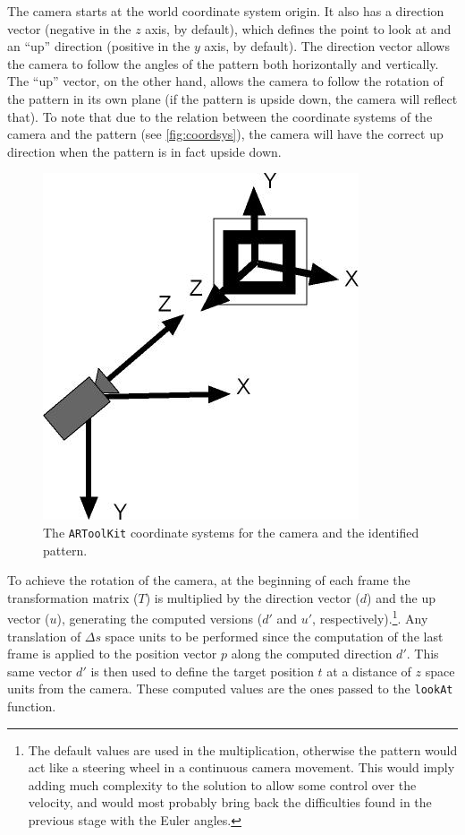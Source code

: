 \documentclass{acmtog}
\begin{document}
The camera starts at the world coordinate system origin. It also has a direction vector (negative in the $z$ axis, by default), which defines the point to look at and an ``up'' direction (positive in the $y$ axis, by default). The direction vector allows the camera to follow the angles of the pattern both horizontally and vertically. The ``up'' vector, on the other hand, allows the camera to follow the rotation of the pattern in its own plane (if the pattern is upside down, the camera will reflect that). To note that due to the relation between the coordinate systems of the camera and the pattern (see \autoref{fig:coordsys}), the camera will have the correct up direction when the pattern is in fact upside down.

\begin{figure}[!htp]
	\begin{center}
		\includegraphics[width=0.6\columnwidth]{images/coordsys.jpg}
	\end{center}
	\caption{The \texttt{ARToolKit} coordinate systems for the camera and the identified pattern.}
	\label{fig:coordsys}
\end{figure}

To achieve the rotation of the camera, at the beginning of each frame the transformation matrix ($T$) is multiplied by the direction vector ($d$) and the up vector ($u$), generating the computed versions ($d'$ and $u'$, respectively).\footnote{The default values are used in the multiplication, otherwise the pattern would act like a steering wheel in a continuous camera movement. This would imply adding much complexity to the solution to  allow some control over the velocity, and would most probably bring back the difficulties found in the previous stage with the Euler angles.}. Any translation of $\Delta s$ space units to be performed since the computation of the last frame is applied to the position vector $p$ along the computed direction $d'$. This same vector $d'$ is then used to define the target position $t$ at a distance of $z$ space units from the camera. These computed values are the ones passed to the \texttt{lookAt} function. 
\end{document}
